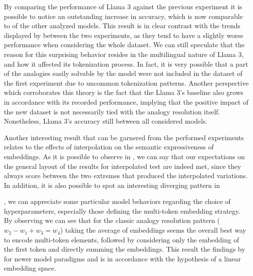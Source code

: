 By comparing the performance of Llama 3 against the previous experiment it is possible to notice an outstanding increase in accuracy, which is now comparable to  of the other analyzed models.
This result is in clear contrast with the trends displayed by  between the two experiments, as they tend to have a slightly worse performance when considering the whole dataset.
We can still speculate that the reason for this surprising behavior resides in the multilingual nature of Llama 3, and how it affected its tokenization process.
In fact, it is very possible that a part of the analogies easily solvable by the model were not included in the dataset of the first experiment due to uncommon tokenization patterns.
Another perspective which corroborates this theory is the fact that the Llama 3's baseline also grows in accordance with its recorded performance, implying that the positive impact of the new dataset is not necessarily tied with the analogy resolution  itself.
Nonetheless, Llama 3's accuracy still  between all considered models. 


Another interesting result that can be garnered from the performed experiments relates to the effects of interpolation on the semantic expressiveness of embeddings.
As it is possible to observe in , we can say that our expectations on the general layout of the results for interpolated test are indeed met, since they always score between the two extremes that produced the interpolated variations.
In addition, it is also possible to spot an interesting diverging pattern in


, we can appreciate some particular model behaviors regarding the choice of hyperparameters, especially those defining the multi-token embedding strategy.
By observing  we can see that for the classic analogy resolution pattern ($w_2 - w_1 + w_3 = w_4$) taking the average of embeddings seems the overall best way to encode multi-token elements, followed by considering only the embedding of the first token and directly summing the embeddings.
This result  the findings  by  for newer model paradigms and is in accordance with the hypothesis of a linear embedding space.

